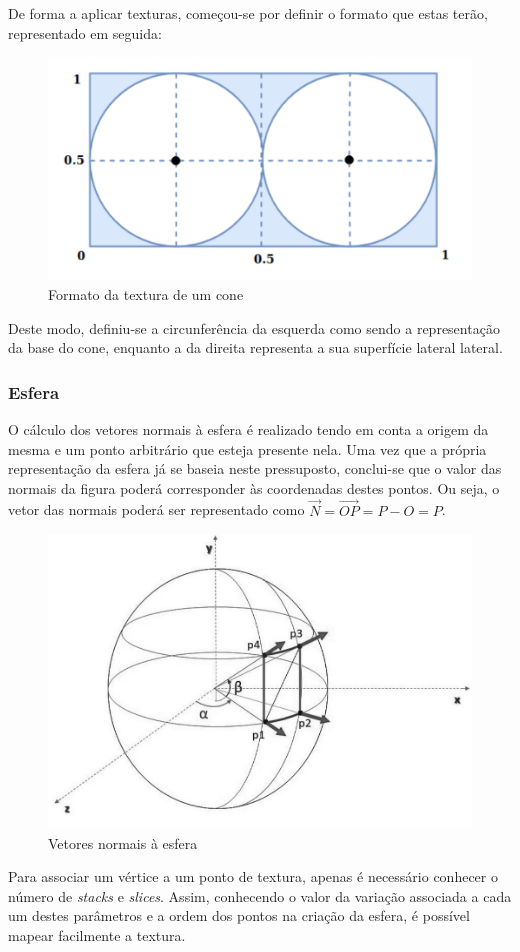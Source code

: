 \documentclass[a4paper, 11pt]{article}
\begin{document}
De forma a aplicar texturas, começou-se por definir o formato que estas terão, representado em 
seguida:

\begin{figure}[H]
    \centering
    \includegraphics[width=.5\textwidth]{img/text_cone.png}
    \caption{Formato da textura de um cone}
\end{figure}

Deste modo, definiu-se a circunferência da esquerda como sendo a representação da base do cone, 
enquanto a da direita representa a sua superfície lateral lateral.

\pagebreak

\subsubsection{Esfera}

O cálculo dos vetores normais à esfera é realizado tendo em conta a origem da mesma e um ponto 
arbitrário que esteja presente nela. Uma vez que a própria representação da esfera já se 
baseia neste pressuposto, conclui-se que o valor das normais da figura poderá corresponder às 
coordenadas destes pontos. Ou seja, o vetor das normais poderá ser representado como 
$\overrightarrow{N} = \overrightarrow{OP} = P - O = P$.

\begin{figure}[H]
    \centering
    \includegraphics[width=.5\textwidth]{img/esfera.png}
    \caption{Vetores normais à esfera}
\end{figure}

Para associar um vértice a um ponto de textura, apenas é necessário conhecer o número de 
\textit{stacks} e \textit{slices}. Assim, conhecendo o valor da variação associada a cada um 
destes parâmetros e a ordem dos pontos na criação da esfera, é possível mapear facilmente a 
textura.
\end{document}
